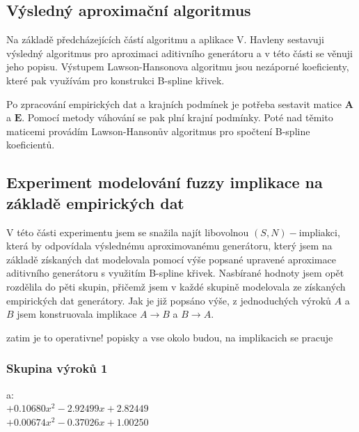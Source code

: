 \subsection{Výsledný aproximační algoritmus}

Na základě předcházejících částí algoritmu a aplikace V. Havleny sestavuji výsledný algoritmus pro aproximaci aditivního generátoru a v této části se věnuji jeho popisu. Výstupem Lawson-Hansonova algoritmu jsou nezáporné koeficienty, které pak využívám pro konstrukci B-spline křivek.

Po zpracování empirických dat a krajních podmínek je potřeba sestavit matice $\mathbf{A}$ a $\mathbf{E}$. Pomocí metody váhování se pak plní krajní podmínky. Poté nad těmito maticemi provádím Lawson-Hanson\r uv algoritmus pro spočtení B-spline koeficient\r u. 


\subsection{Experiment modelování fuzzy implikace na základě empirických dat}

V této části experimentu jsem se snažila najít libovolnou $(S,N)-$impliakci, která by odpovídala výslednému aproximovanému generátoru, který jsem na základě získaných dat modelovala pomocí výše popsané upravené aproximace aditivního generátoru s využitím B-spline křivek. Nasbírané hodnoty jsem opět rozdělila do pěti skupin, přičemž jsem v každé skupině modelovala ze získaných empirických dat generátory. Jak je již popsáno výše, z jednoduchých výrok\r u $A$ a $B$ jsem konstruovala implikace $A \to B$ a $B \to A$.

{\color{blue}zatim je to operativne! popisky a vse okolo budou, na implikacich se pracuje}
\subsubsection{Skupina výrok\r u 1}
a:\\
$+0.10680x^2-2.92499x+2.82449$\\
$+0.00674x^2-0.37026x+1.00250$\\

